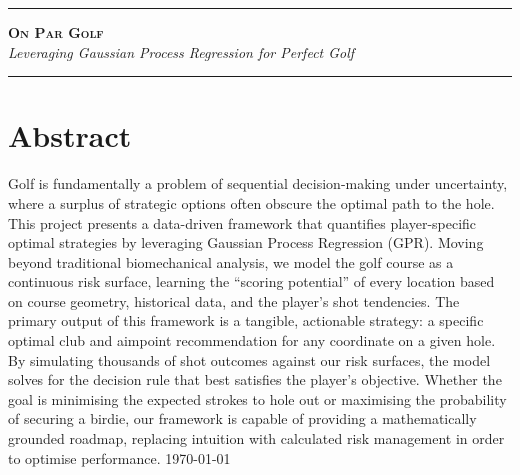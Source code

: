 \documentclass[11pt, letterpaper]{article}
\begin{document}
\newcommand{\origin}{(x_1^0,x_2^0)}
\newcommand{\landing}{(x_1^l,x_2^l)}
\newcommand{\coord}{(x_1, x_2)}
\newcommand{\shotdec}{\mathbf{x}}
\newcommand{\aimpoint}{\theta}
\newcommand{\out}{\mathbf{x}}
\newcommand{\Out}{\mathbf{X}}
\newcommand{\Samp}{\mathbf{Z}}
\newcommand{\samp}{\mathbf{z}}
\newcommand{\gridexplicit}[1]{(x^{#1}_1, x^{#1}_2)}
\newcommand{\grid}{\mathbf{g}}
\newcommand{\rotation}{\mathbf{M}}




\begin{titlepage}
   \begingroup 
    \centering
    \vspace*{2.5cm}
    
    \rule{\textwidth}{1.5pt}\vspace{0.5cm}
    
    {\huge \bfseries \scshape On Par Golf} \\
    \vspace{0.3cm}
    {\Large \itshape Leveraging Gaussian Process Regression for Perfect Golf} %
    
    \vspace{0.5cm}
    \rule{\textwidth}{1.5pt}
    
    \vspace{3cm}
   \endgroup 
    
    \section*{Abstract}
    \noindent
       Golf is fundamentally a problem of sequential decision-making under uncertainty, where a surplus of strategic options often obscure the optimal path to the hole. This project presents a data-driven framework that quantifies player-specific optimal strategies by leveraging Gaussian Process Regression (GPR). Moving beyond traditional biomechanical analysis, we model the golf course as a continuous risk surface, learning the ``scoring potential'' of every location based on course geometry, historical data, and the player's shot tendencies. The primary output of this framework is a tangible, actionable strategy: a specific optimal club and aimpoint recommendation for any coordinate on a given hole. By simulating thousands of shot outcomes against our risk surfaces, the model solves for the decision rule that best satisfies the player's objective. Whether the goal is minimising the expected strokes to hole out or maximising the probability of securing a birdie, our framework is capable of providing a mathematically grounded roadmap, replacing intuition with calculated risk management in order to optimise performance.
    \vfill
    \today
\end{titlepage}
\end{document}
